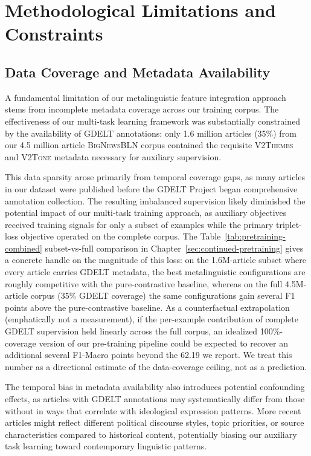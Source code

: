 \section{Methodological Limitations and Constraints}
\label{sec:methodological-limitations}

\subsection{Data Coverage and Metadata Availability}

A fundamental limitation of our metalinguistic feature integration approach stems from incomplete metadata coverage across our training corpus. The effectiveness of our multi-task learning framework was substantially constrained by the availability of GDELT annotations: only 1.6 million articles (35\%) from our 4.5 million article \textsc{BigNewsBLN} corpus contained the requisite \textsc{V2Themes} and \textsc{V2Tone} metadata necessary for auxiliary supervision.

This data sparsity arose primarily from temporal coverage gaps, as many articles in our dataset were published before the GDELT Project began comprehensive annotation collection. The resulting imbalanced supervision likely diminished the potential impact of our multi-task training approach, as auxiliary objectives received training signals for only a subset of examples while the primary triplet-loss objective operated on the complete corpus. The Table~\ref{tab:pretraining-combined} subset-vs-full comparison in Chapter~\ref{sec:continued-pretraining} gives a concrete handle on the magnitude of this loss: on the 1.6M-article subset where every article carries GDELT metadata, the best metalinguistic configurations are roughly competitive with the pure-contrastive baseline, whereas on the full 4.5M-article corpus (35\% GDELT coverage) the same configurations gain several F1 points above the pure-contrastive baseline. As a counterfactual extrapolation (emphatically not a measurement), if the per-example contribution of complete GDELT supervision held linearly across the full corpus, an idealized 100\%-coverage version of our pre-training pipeline could be expected to recover an additional several F1-Macro points beyond the 62.19 we report. We treat this number as a directional estimate of the data-coverage ceiling, not as a prediction.

The temporal bias in metadata availability also introduces potential confounding effects, as articles with GDELT annotations may systematically differ from those without in ways that correlate with ideological expression patterns. More recent articles might reflect different political discourse styles, topic priorities, or source characteristics compared to historical content, potentially biasing our auxiliary task learning toward contemporary linguistic patterns.

